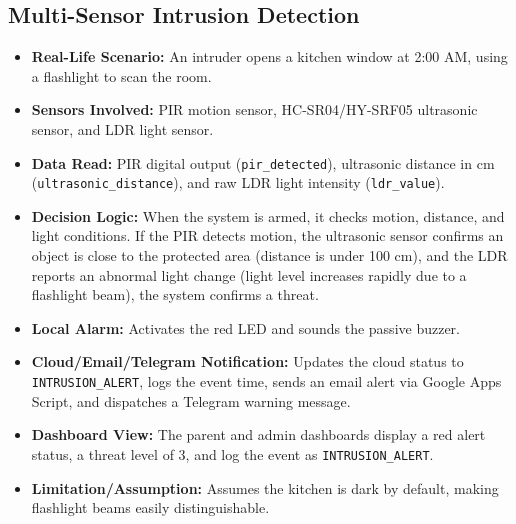\documentclass[11pt,a4paper]{report}
\begin{document}
\subsection{Multi-Sensor Intrusion Detection}
\begin{itemize}
    \item \textbf{Real-Life Scenario:} An intruder opens a kitchen window at 2:00 AM, using a flashlight to scan the room.
    \item \textbf{Sensors Involved:} PIR motion sensor, HC-SR04/HY-SRF05 ultrasonic sensor, and LDR light sensor.
    \item \textbf{Data Read:} PIR digital output (\texttt{pir\_detected}), ultrasonic distance in cm (\texttt{ultrasonic\_distance}), and raw LDR light intensity (\texttt{ldr\_value}).
    \item \textbf{Decision Logic:} When the system is armed, it checks motion, distance, and light conditions. If the PIR detects motion, the ultrasonic sensor confirms an object is close to the protected area (distance is under 100 cm), and the LDR reports an abnormal light change (light level increases rapidly due to a flashlight beam), the system confirms a threat.
    \item \textbf{Local Alarm:} Activates the red LED and sounds the passive buzzer.
    \item \textbf{Cloud/Email/Telegram Notification:} Updates the cloud status to \texttt{INTRUSION\_ALERT}, logs the event time, sends an email alert via Google Apps Script, and dispatches a Telegram warning message.
    \item \textbf{Dashboard View:} The parent and admin dashboards display a red alert status, a threat level of 3, and log the event as \texttt{INTRUSION\_ALERT}.
    \item \textbf{Limitation/Assumption:} Assumes the kitchen is dark by default, making flashlight beams easily distinguishable.
\end{itemize}
\end{document}
